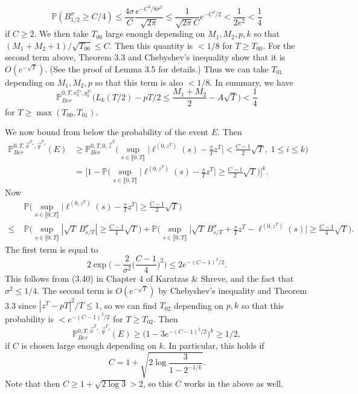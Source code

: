 \documentclass[12pt]{article}
\begin{document}
	\[
	\mathbb{P}(B_{1/2}^{\sigma} \geq C/4) \leq \frac{4\sigma}{C}\frac{e^{-C^2/8\sigma^2}}{\sqrt{2\pi}} \leq \frac{1}{\sqrt{2\pi}C}e^{-C^2/2} < \frac{1}{2e^2} < \frac{1}{4}
	\]
	if $C\geq 2$. We then take $T_{00}$ large enough depending on $M_1,M_2,p,k$ so that $(M_1+M_2+1)/\sqrt{T_{00}}\leq C$. Then this quantity is $<1/8$ for $T\geq T_{00}$. For the second term above, Theorem 3.3 and Chebyshev's inequality show that it is $O(e^{-\sqrt{T}})$. (See the proof of Lemma 3.5 for details.) Thus we can take $T_{01}$ depending on $M_1,M_2,p$ so that this term is also $<1/8$. In summary, we have
	\[
	\mathbb{P}^{0,T,x_k^T{}',y_k^T{}'}_{Ber} \Big( L_k(T/2) - pT/2 \leq \frac{M_1+M_2}{2} - A\sqrt{T} \Big) < \frac{1}{4}
	\]
	for $T\geq\max(T_{00},T_{01})$.
	
	We now bound from below the probability of the event $E$. Then
	\begin{align*}
	\mathbb{P}^{0,T,\vec{x}^T{}',\vec{y}^T{}'}_{Ber}(E) &\geq \mathbb{P}^{0,T,0,\vec{z}^T}_{Ber} \Big( \sup_{s\in\llbracket 0, T\rrbracket} \Big|\ell^{(0,z^T)}(s) - \frac{s}{T}z^T\Big| < \frac{C-1}{2}\sqrt{T},\; 1\leq i\leq k \Big)\\
	&= \Big[ 1 - \mathbb{P} \Big( \sup_{s\in\llbracket 0, T\rrbracket} \Big|\ell^{(0,z^T)}(s) - \frac{s}{T}z^T\Big| \geq \frac{C-1}{2}\sqrt{T} \Big) \Big]^k.
	\end{align*}
	Now
	\begin{align*}
	&\mathbb{P} \Big( \sup_{s\in\llbracket 0, T\rrbracket} \Big|\ell^{(0,z^T)}(s) - \frac{s}{T}z^T\Big| \geq \frac{C-1}{2}\sqrt{T} \Big)\\
	\leq \; & \mathbb{P} \Big( \sup_{s\in\llbracket 0, T\rrbracket} |\sqrt{T}\,B^{\sigma}_{s/T}| \geq \frac{C-1}{4}\sqrt{T}\Big) + \mathbb{P} \Big( \sup_{s\in\llbracket 0, T\rrbracket} \Big|\sqrt{T}\,B^{\sigma}_{s/T} + \frac{s}{T}z^T - \ell^{(0,z^T)}(s)\Big| \geq \frac{C-1}{4}\sqrt{T} \Big).
	\end{align*}
	The first term is equal to
	\[
	2\exp\Big( - \frac{2}{\sigma^2}\Big(\frac{C-1}{4}\Big)^2\Big) \leq 2e^{-(C-1)^2/2}.
	\]
	This follows from (3.40) in Chapter 4 of Karatzas \& Shreve, and the fact that $\sigma^2 \leq 1/4$. The second term is $O(e^{-\sqrt{T}})$ by Chebyshev's inequality and Theorem 3.3 since $|z^T-pT|^2/T \leq 1$, so we can find $T_{02}$ depending on $p,k$ so that this probability is $< e^{-(C-1)^2/2}$ for $T\geq T_{02}$. Then
	\[
	\mathbb{P}^{0,T,\vec{x}^T{}',\vec{y}^T{}'}_{Ber}(E) \geq \big(1 - 3e^{-(C-1)^2/2}\big)^k \geq 1/2,
	\]
	if $C$ is chosen large enough depending on $k$. In particular, this holds if
	\[
	C = 1 + \sqrt{2\log\frac{3}{1-2^{-1/k}}}.
	\] 
	Note that then $ C \geq 1 + \sqrt{2\log 3} > 2$, so this $C$ works in the above as well. 
	
\end{document}
